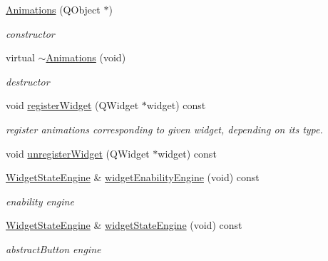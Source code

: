 \begin{DoxyCompactItemize}
\item 
\mbox{\label{class_animations_a1809af983dd0dad46b79fe0e562d9875}} 
\hyperlink{class_animations_a1809af983dd0dad46b79fe0e562d9875}{Animations} (Q\+Object $\ast$)
\begin{DoxyCompactList}\small\item\em constructor \end{DoxyCompactList}\item 
\mbox{\label{class_animations_a3fd1d83f305a9ed8914fd97c965c356c}} 
virtual \hyperlink{class_animations_a3fd1d83f305a9ed8914fd97c965c356c}{$\sim$\+Animations} (void)
\begin{DoxyCompactList}\small\item\em destructor \end{DoxyCompactList}\item 
\mbox{\label{class_animations_a551aebae9cf69d546387bcec7372933f}} 
void \hyperlink{class_animations_a551aebae9cf69d546387bcec7372933f}{register\+Widget} (Q\+Widget $\ast$widget) const
\begin{DoxyCompactList}\small\item\em register animations corresponding to given widget, depending on its type. \end{DoxyCompactList}\item 
void \hyperlink{class_animations_ad6548222fa0c1211c227bec1b2c7a7c7}{unregister\+Widget} (Q\+Widget $\ast$widget) const
\item 
\mbox{\label{class_animations_a1be4d1ad0c37c6d3e6ffed7d4c40872d}} 
\hyperlink{class_widget_state_engine}{Widget\+State\+Engine} \& \hyperlink{class_animations_a1be4d1ad0c37c6d3e6ffed7d4c40872d}{widget\+Enability\+Engine} (void) const
\begin{DoxyCompactList}\small\item\em enability engine \end{DoxyCompactList}\item 
\mbox{\label{class_animations_a538f7bf6df8679139f5504fa08348257}} 
\hyperlink{class_widget_state_engine}{Widget\+State\+Engine} \& \hyperlink{class_animations_a538f7bf6df8679139f5504fa08348257}{widget\+State\+Engine} (void) const
\begin{DoxyCompactList}\small\item\em abstract\+Button engine \end{DoxyCompactList}\item 

\end{DoxyCompactItemize}
